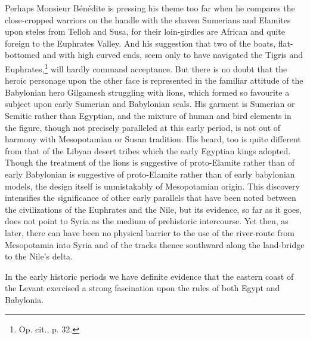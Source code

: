 \documentclass[12pt,oneside]{book}
\begin{document}
Perhaps Monsieur B\'en\'edite is pressing his theme too far when he compares the close-cropped warriors on the handle with the shaven Sumerians and Elamites upon steles from Telloh and Susa, for their loin-girdles are African and quite foreign to the Euphrates Valley. And his suggestion that two of the boats, flat-bottomed and with high curved ends, seem only to have navigated the Tigris and Euphrates,\footnote{Op. cit., p. 32.} will hardly command acceptance. But there is no doubt that the heroic personage upon the other face is represented in the familiar attitude of the Babylonian hero Gilgamesh struggling with lions, which formed so favourite a subject upon early Sumerian and Babylonian seals. His garment is Sumerian or Semitic rather than Egyptian, and the mixture of human and bird elements in the figure, though not precisely paralleled at this early period, is not out of harmony with Mesopotamian or Susan tradition. His beard, too is quite different from that of the Libyan desert tribes which the early Egyptian kings adopted. Though the treatment of the lions is suggestive of proto-Elamite rather than of early Babylonian is suggestive of proto-Elamite rather than of early babylonian models, the design itself is unmistakably of Mesopotamian origin. This discovery intensifies the significance of other early parallels that have been noted between the civilizations of the Euphrates and the Nile, but its evidence, so far as it goes, does not point to Syria as the medium of prehistoric intercourse. Yet then, as later, there can have been no physical barrier to the use of the river-route from Mesopotamia into Syria and of the tracks thence southward along the land-bridge to the Nile's delta. \par 

In the early historic periods we have definite evidence that the eastern coast of the Levant exercised a strong fascination upon the rules of both Egypt and Babylonia. 
\end{document}
